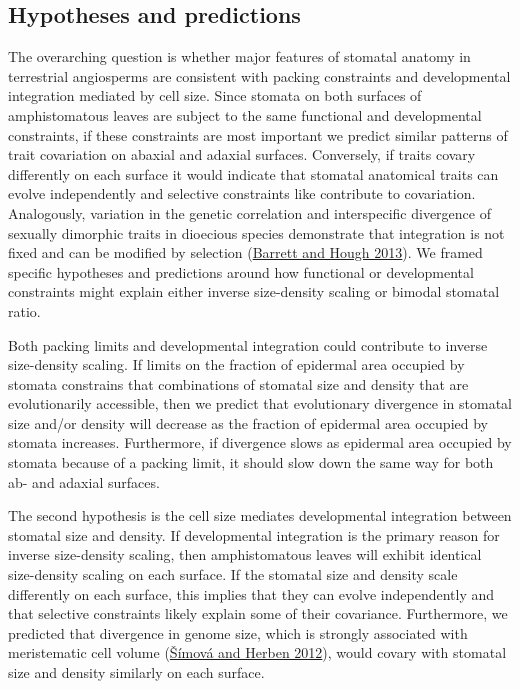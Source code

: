 \documentclass[
  12pt,
]{article}
\begin{document}
\hypertarget{hypotheses-and-predictions}{%
\subsection{Hypotheses and predictions}\label{hypotheses-and-predictions}}

The overarching question is whether major features of stomatal anatomy in terrestrial angiosperms are consistent with packing constraints and developmental integration mediated by cell size. Since stomata on both surfaces of amphistomatous leaves are subject to the same functional and developmental constraints, if these constraints are most important we predict similar patterns of trait covariation on abaxial and adaxial surfaces. Conversely, if traits covary differently on each surface it would indicate that stomatal anatomical traits can evolve independently and selective constraints like contribute to covariation. Analogously, variation in the genetic correlation and interspecific divergence of sexually dimorphic traits in dioecious species demonstrate that integration is not fixed and can be modified by selection (\protect\hyperlink{ref-barrett_sexual_2013}{Barrett and Hough 2013}). We framed specific hypotheses and predictions around how functional or developmental constraints might explain either inverse size-density scaling or bimodal stomatal ratio.


Both packing limits and developmental integration could contribute to inverse size-density scaling. If limits on the fraction of epidermal area occupied by stomata constrains that combinations of stomatal size and density that are evolutionarily accessible, then we predict that evolutionary divergence in stomatal size and/or density will decrease as the fraction of epidermal area occupied by stomata increases. Furthermore, if divergence slows as epidermal area occupied by stomata because of a packing limit, it should slow down the same way for both ab- and adaxial surfaces.

The second hypothesis is the cell size mediates developmental integration between stomatal size and density. If developmental integration is the primary reason for inverse size-density scaling, then amphistomatous leaves will exhibit identical size-density scaling on each surface. If the stomatal size and density scale differently on each surface, this implies that they can evolve independently and that selective constraints likely explain some of their covariance. Furthermore, we predicted that divergence in genome size, which is strongly associated with meristematic cell volume (\protect\hyperlink{ref-simova_geometrical_2012}{Šímová and Herben 2012}), would covary with stomatal size and density similarly on each surface.
\end{document}
